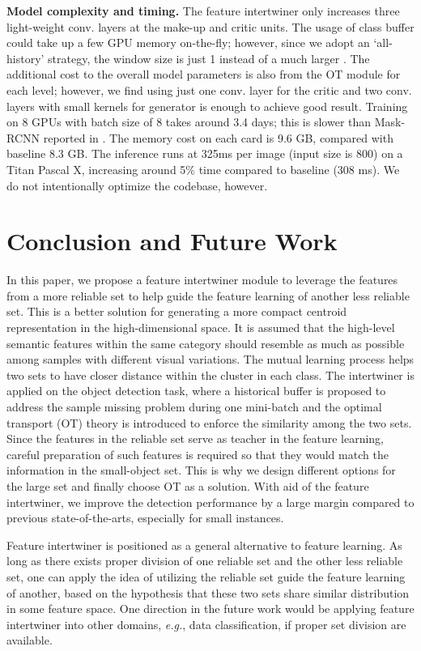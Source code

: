 \documentclass{article} \usepackage{iclr2019_conference,times}
\begin{document}
\textbf{Model complexity and timing.} The feature intertwiner only increases three light-weight conv. layers at the make-up and critic units. The usage of class buffer could take up a few GPU memory on-the-fly; however, since we adopt an `all-history' strategy, the window size is just 1 instead of a much larger . 
The additional cost to the overall model parameters is also from the OT module for each level; however, we find using just one conv. layer for the critic  and two conv. layers with small kernels for generator  is enough to achieve good result. Training on 8 GPUs with batch size of 8 takes around 3.4 days; this is slower than Mask-RCNN reported in \citep{he2017_mask_rcnn}. The memory cost on each card is 9.6 GB, compared with baseline 8.3 GB. 
The inference runs at 325ms per image (input size is 800) on a Titan Pascal X, increasing around 5\% time compared to baseline (308 ms). We do {not} intentionally optimize the codebase, however. 


\section{Conclusion and Future Work}

In this paper, we propose a feature intertwiner module to 
leverage the features from a more reliable set to help guide the feature learning of another less reliable set. This is a better solution for generating a more compact centroid representation in the high-dimensional space. It is assumed that the high-level semantic features within the same category should resemble as much as possible among samples with different visual variations. The mutual learning process helps two sets to have closer distance within the cluster in each class. The intertwiner is applied on the object detection task, where a historical buffer is proposed to address the sample missing problem during one mini-batch and the optimal transport (OT) theory is introduced to enforce the similarity among the two sets. Since the features in the reliable set serve as teacher in the feature learning, careful preparation of such features is required so that they would match the information in the small-object set. This is why we design different options for the large set and finally choose OT as a solution.
With aid of the feature intertwiner, we improve the detection performance by a large margin compared to previous state-of-the-arts, especially for small instances. 

{
Feature intertwiner is positioned as a general alternative to feature learning.
As long as there exists proper division of one reliable set and the other less reliable set, one can apply the idea of utilizing the reliable set guide the feature learning of another, based on the hypothesis that these two sets share similar distribution in some feature space. One direction in the future work would be applying feature intertwiner into other domains, \textit{e.g.}, data classification, if proper set division are available.
}
\end{document}
